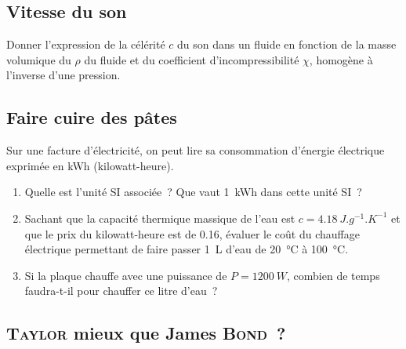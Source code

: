 \documentclass[../main/main.tex]{subfiles}
\begin{document}
\subsection{Vitesse du son}

Donner l'expression de la célérité $c$ du son dans un fluide en fonction de la
masse volumique du $\rho$ du fluide et du coefficient d'incompressibilité
$\chi$, homogène à l'inverse d'une pression.

\subsection{Faire cuire des pâtes}
Sur une facture d'électricité, on peut lire sa consommation d'énergie électrique
exprimée en \si{kWh} (kilowatt-heure).
\begin{enumerate}
	\item Quelle est l'unité SI associée~? Que vaut \SI{1}{kWh} dans cette unité
	      SI~?
	\item Sachant que la capacité thermique massique de l'eau est $c = \SI{4.18}{J.g^{-1}.K^{-1}}$ et que le prix du
	      kilowatt-heure est de \SI{0.16}{\EUR}, évaluer le coût du chauffage électrique
	      permettant de faire passer \SI{1}{L} d'eau de \SI{20}{\degreeCelsius} à
	      \SI{100}{\degreeCelsius}.
	\item Si la plaque chauffe avec une puissance de $P = \SI{1200}{W}$, combien de
	      temps faudra-t-il pour chauffer ce litre d'eau~?
\end{enumerate}

\subsection{\textsc{Taylor} mieux que James \textsc{Bond}~?}
\end{document}
